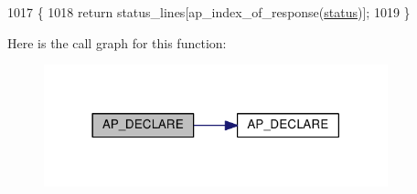 \begin{DoxyCode}
1017 \{
1018     \textcolor{keywordflow}{return} status\_lines[ap\_index\_of\_response(\hyperlink{group__APACHE__CORE__HTTPD_ga6e27f49150e9a14580fb313cc2777e00}{status})];
1019 \}
\end{DoxyCode}


Here is the call graph for this function\+:
\nopagebreak
\begin{figure}[H]
\begin{center}
\leavevmode
\includegraphics[width=282pt]{group__get__remote__host_gaa0b6d3ee3cfd9a8e8cb57936e467abfd_cgraph}
\end{center}
\end{figure}


